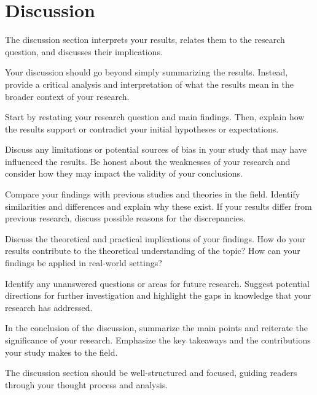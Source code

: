 \chapter{Discussion}

The discussion section interprets your results, relates them to the research question, and discusses their implications.

Your discussion should go beyond simply summarizing the results. Instead, provide a critical analysis and interpretation of what the results mean in the broader context of your research.

Start by restating your research question and main findings. Then, explain how the results support or contradict your initial hypotheses or expectations.

Discuss any limitations or potential sources of bias in your study that may have influenced the results. Be honest about the weaknesses of your research and consider how they may impact the validity of your conclusions.

Compare your findings with previous studies and theories in the field. Identify similarities and differences and explain why these exist. If your results differ from previous research, discuss possible reasons for the discrepancies.

Discuss the theoretical and practical implications of your findings. How do your results contribute to the theoretical understanding of the topic? How can your findings be applied in real-world settings?

Identify any unanswered questions or areas for future research. Suggest potential directions for further investigation and highlight the gaps in knowledge that your research has addressed.

In the conclusion of the discussion, summarize the main points and reiterate the significance of your research. Emphasize the key takeaways and the contributions your study makes to the field.

The discussion section should be well-structured and focused, guiding readers through your thought process and analysis.

